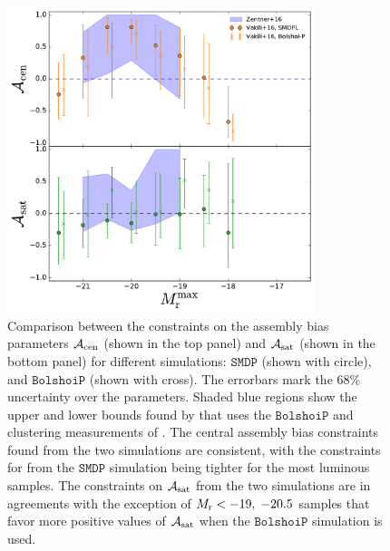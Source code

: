\begin{figure}[p]~\\
\begin{center}
\includegraphics[width=0.8\textwidth]{bias_comparison.pdf}
\caption{Comparison between the constraints on the assembly bias parameters $\mathcal{A}_{\rm cen}$ (shown in the top panel) and $\mathcal{A}_{\rm sat}$ (shown in the bottom panel) for different simulations: $\mathtt{SMDP}$ (shown with circle), and $\mathtt{BolshoiP}$ (shown with cross). The errorbars mark the 68$\%$ uncertainty over the parameters. Shaded blue regions show the upper and lower bounds found by \citealt{zentner2016} that uses the $\mathtt{BolshoiP}$ and clustering measurements of \citealt{zehavi2011}. The central assembly bias constraints found from the two simulations are consistent, with the constraints for from the $\mathtt{SMDP}$ simulation being tighter for the most luminous samples. The constraints on $\mathcal{A}_{\rm sat}$ from the two simulations are in agreements with the exception of $M_{\rm r}<-19 ,\; -20.5$ samples that favor more positive values of $\mathcal{A}_{\rm sat}$ when the $\mathtt{BolshoiP}$ simulation is used.}
\label{fig:bias_comparison}
\end{center}
\end{figure}

\clearpage

